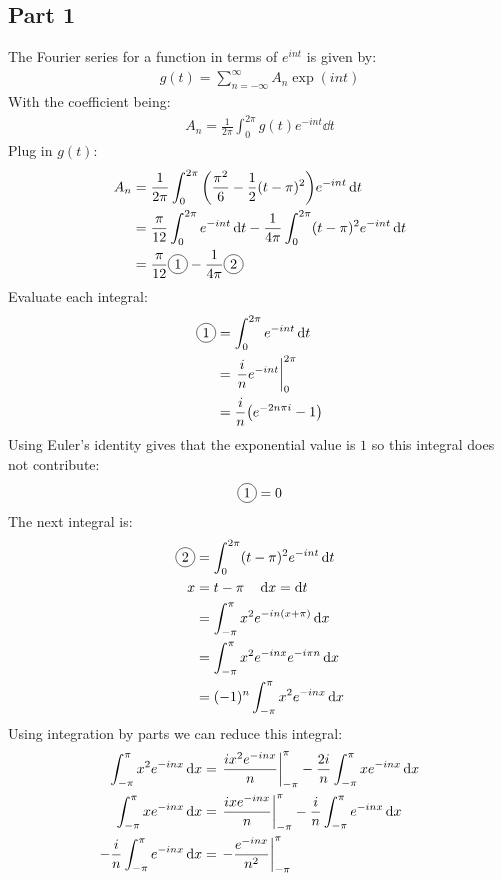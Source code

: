 \documentclass[12pt]{article}
\newcommand*\circled[1]{\tikz[baseline=(char.base)]{
            \node[shape=circle,draw,inner sep=2pt] (char) {#1};}}
\begin{document}
\subsection*{Part 1}
The Fourier series for a function in terms of $e^{int}$ is given by:
\begin{align*}
  g(t)=\sum_{n=-\infty}^{\infty}A_n\exp(int)
\end{align*}
With the coefficient being:
\begin{align*}
  A_n=\frac{1}{2\pi}\int_0^{2\pi}g(t)e^{-int}\dd{t}
\end{align*}
Plug in $g(t)$:
\begin{align*}
  A_n&=\frac{1}{2\pi}\int_0^{2\pi}
  \qty(\frac{\pi^2}{6}-\frac12(t-\pi)^2)e^{-int}\dd{t}\\
  &=\frac\pi{12}\int_0^{2\pi}e^{-int}\dd{t}
  -\frac{1}{4\pi}\int_0^{2\pi}(t-\pi)^2e^{-int}\dd{t}\\
  &=\frac{\pi}{12}\circled{1}-\frac{1}{4\pi}\circled{2}
\end{align*}
Evaluate each integral:
\begin{align*}
  \circled{1}&=\int_0^{2\pi}e^{-int}\dd{t}\\
  &=\eval{\frac{i}{n}e^{-int}}_{0}^{2\pi}\\
  &=\frac{i}{n}\qty(e^{-2n\pi i}-1)
\end{align*}
Using Euler's identity gives that the exponential value is $1$ so this integral does not contribute:
\begin{align*}
  \circled{1}=0
\end{align*}
The next integral is:
\begin{align*}
  \circled{2}&=\int_0^{2\pi}(t-\pi)^2e^{-int}\dd{t}\\
  x&=t-\pi \quad \dd{x}=\dd{t}\\
  &=\int_{-\pi}^{\pi}x^2e^{-in(x+\pi)}\dd{x}\\
  &=\int_{-\pi}^\pi x^2e^{-inx}e^{-i\pi n}\dd{x}\\
  &=(-1)^n\int_{-\pi}^{\pi}x^2e^{-inx}\dd{x}
\end{align*}
Using integration by parts we can reduce this integral:
\begin{align*}
  \int_{-\pi}^{\pi}x^2e^{-inx}\dd{x}&=\eval{\frac{ix^2e^{-inx}}{n}}_{-\pi}^\pi
  -\frac{2i}{n}\int_{-\pi}^\pi xe^{-inx}\dd{x}\\
  \int_{-\pi}^\pi xe^{-inx}\dd{x}&=\eval{\frac{ixe^{-inx}}{n}}_{-\pi}^\pi
  -\frac{i}{n}\int_{-\pi}^\pi e^{-inx}\dd{x}\\
  -\frac{i}{n}\int_{-\pi}^\pi e^{-inx}\dd{x}&=
  \eval{-\frac{e^{-inx}}{n^2}}_{-\pi}^\pi
\end{align*}
\end{document}
